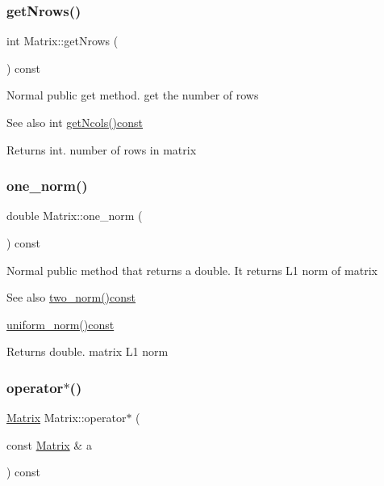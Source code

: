 \subsubsection{\texorpdfstring{get\+Nrows()}{getNrows()}}
{\footnotesize\ttfamily int Matrix\+::get\+Nrows (\begin{DoxyParamCaption}{ }\end{DoxyParamCaption}) const}

Normal public get method. get the number of rows \begin{DoxySeeAlso}{See also}
int \hyperlink{class_matrix_ae0a5f2154953b8d129a90b04f91d9079}{get\+Ncols()const} 
\end{DoxySeeAlso}
\begin{DoxyReturn}{Returns}
int. number of rows in matrix 
\end{DoxyReturn}
\mbox{\label{class_matrix_af4d468252f3ecbbcaa5726c76e332b4c}} 
\subsubsection{\texorpdfstring{one\+\_\+norm()}{one\_norm()}}
{\footnotesize\ttfamily double Matrix\+::one\+\_\+norm (\begin{DoxyParamCaption}{ }\end{DoxyParamCaption}) const}

Normal public method that returns a double. It returns L1 norm of matrix \begin{DoxySeeAlso}{See also}
\hyperlink{class_matrix_aac496af05ec7aa26afc2b9c6d0ab8b66}{two\+\_\+norm()const} 

\hyperlink{class_matrix_a43066c7fe6418aad40170b85415063e8}{uniform\+\_\+norm()const} 
\end{DoxySeeAlso}
\begin{DoxyReturn}{Returns}
double. matrix L1 norm 
\end{DoxyReturn}
\mbox{\label{class_matrix_aaa40c78e6b3bb5bbf572d35612dbf6a7}} 
\subsubsection{\texorpdfstring{operator$\ast$()}{operator*()}\hspace{0.1cm}{\footnotesize\ttfamily [1/2]}}
{\footnotesize\ttfamily \hyperlink{class_matrix}{Matrix} Matrix\+::operator$\ast$ (\begin{DoxyParamCaption}\item[{const \hyperlink{class_matrix}{Matrix} \&}]{a }\end{DoxyParamCaption}) const}

